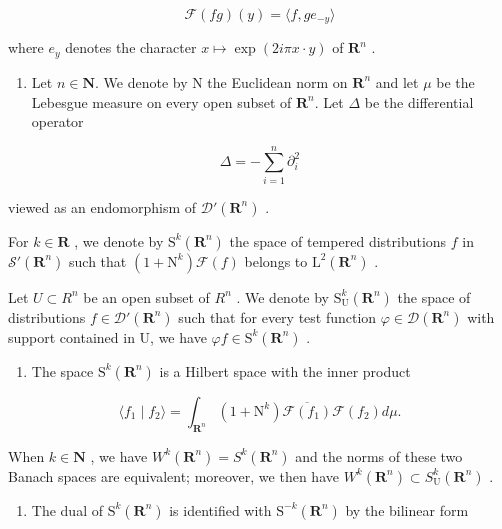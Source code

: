 \[
\mathcal {F} (f g) (y) = \langle f, g e _ {- y} \rangle
\]

where \(e_y\) denotes the character \(x \mapsto \exp(2i\pi x \cdot y)\) of \(\mathbf{R}^n\) .

\begin{enumerate}
\def\labelenumi{\arabic{enumi})}
\setcounter{enumi}{26}
\tightlist
\item
  Let \(n \in \mathbf{N}\). We denote by N the Euclidean norm on \(\mathbf{R}^{n}\) and let \(\mu\) be the Lebesgue measure on every open subset of \(\mathbf{R}^{n}\). Let \(\Delta\) be the differential operator
\end{enumerate}

\[
\Delta = - \sum_ {i = 1} ^ {n} \partial_ {i} ^ {2}
\]

viewed as an endomorphism of \(\mathcal{D}'(\mathbf{R}^{n})\) .

For \(k \in \mathbf{R}\) , we denote by \(\mathrm{S}^k(\mathbf{R}^n)\) the space of tempered distributions \(f\) in \(\mathcal{S}'(\mathbf{R}^n)\) such that \((1 + \mathrm{N}^k)\mathcal{F}(f)\) belongs to \(\mathrm{L}^2(\mathbf{R}^n)\) .

Let \(U \subset R^{n}\) be an open subset of \(R^{n}\) . We denote by \(\mathrm{S}_{\mathrm{U}}^{k}(\mathbf{R}^{n})\) the space of distributions \(f \in \mathcal{D}'(\mathbf{R}^{n})\) such that for every test function \(\varphi \in \mathcal{D}(\mathbf{R}^{n})\) with support contained in U, we have \(\varphi f \in \mathrm{S}^{k}(\mathbf{R}^{n})\) .

\begin{enumerate}
\def\labelenumi{\alph{enumi})}
\tightlist
\item
  The space \(\mathrm{S}^{k}(\mathbf{R}^{n})\) is a Hilbert space with the inner product
\end{enumerate}

\[
\langle f _ {1} \mid f _ {2} \rangle = \int_ {\mathbf {R} ^ {n}} (1 + \mathrm{N} ^ {k}) \overline {{\mathcal {F} (f _ {1})}} \mathcal {F} (f _ {2}) d \mu .
\]

When \(k \in \mathbf{N}\) , we have \(W^{k}(\mathbf{R}^{n}) = S^{k}(\mathbf{R}^{n})\) and the norms of these two Banach spaces are equivalent; moreover, we then have \(W^{k}(\mathbf{R}^{n}) \subset S_{\mathrm{U}}^{k}(\mathbf{R}^{n})\) .

\begin{enumerate}
\def\labelenumi{\alph{enumi})}
\setcounter{enumi}{1}
\tightlist
\item
  The dual of \(\mathrm{S}^{k}(\mathbf{R}^{n})\) is identified with \(\mathrm{S}^{-k}(\mathbf{R}^{n})\) by the bilinear form
\end{enumerate}

